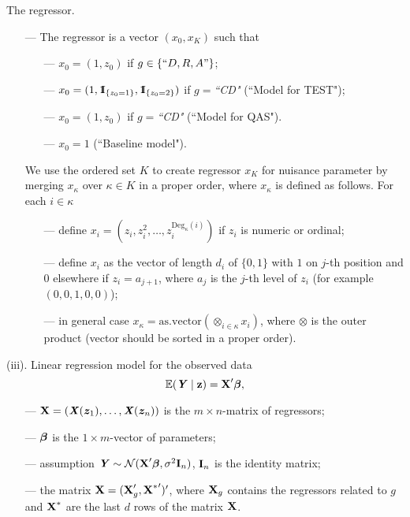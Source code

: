 \documentclass[11pt]{article}
\begin{document}
The regressor.\vspace{-2mm}
\begin{itemize}
\setlength\itemsep{-0.3em}
\item[---]
The regressor is a vector $(x_0,x_{K})$ such that \vspace{-2mm}
\begin{itemize}
\setlength\itemsep{-0.3em}
\item[---]
$x_0=(1,z_0)$ if  $g\in\{``D,R,A"\}$;
\item[---]
$x_0=(1,\indi_{\{z_0=1\}},\indi_{\{z_0=2\}})$ if  $g=${\it ``CD"} (``Model for TEST");
\item[---]
$x_0=(1,z_0)$ if  $g=${\it ``CD"}   (``Model for QAS").
\item[---]
$x_0=1$ (``Baseline model").
\end{itemize}
We use the ordered set $K$ to create regressor $x_K$ for nuisance parameter by merging $x_{\kappa}$ over $\kappa\in K$ in a proper order, where  $x_{\kappa}$ is defined as follows. For each $i\in\kappa$ \vspace{-2mm}
\begin{itemize}
\setlength\itemsep{-0.3em}
\item[---]
define $x_i=(z_i,z_i^2,\ldots,z_i^{\mathrm{Deg}_\kappa(i)})$ if $z_i$ is numeric or ordinal;
\item[---]
define $x_i$ as the vector of length $d_i$ of $\{0,1\}$ with $1$ on $j$-th position and $0$ elsewhere if $z_i=a_{j+1}$, where $a_j$ is the $j$-th level of $z_i$ (for example $(0,0,1,0,0)$);
\item[---]
in general case $ x_{\kappa}=\mathrm{as.vector}(\otimes_{i\in\kappa} x_i)$, where $\otimes$ is the outer product (vector should be sorted in a proper order).
\end{itemize}
\end{itemize}
(iii). Linear regression model for the observed data
$$
\E(\Ybi\mid\zb)=\Xb'\betab,
\vspace{-3mm}
$$
\begin{itemize}
\setlength\itemsep{-0.3em}
\item[---]
$\mbox{\bf X}=(\mbox{\textbf{\textit X}}(\mbox{\textbf{\textit z}}_1),\ldots,\mbox{\textbf{\textit X}}(\mbox{\textbf{\textit z}}_n))$ is the $m\times n$-matrix of regressors;
\item[---]
${\boldsymbol \beta}$ is the $1\times m$-vector of parameters;
\item[---]
assumption $\mbox{\textbf{\textit Y}}\sim {\cal N}(\mbox{\bf X}'{\boldsymbol \beta},\sigma^2 \mbox{\bf I}_n)$, $\mbox{\bf I}_n$ is the identity matrix;
\item[---]
the matrix $\mbox{\bf X}=(\mbox{\bf X}'_g,{\mbox{\bf X}^*}')'$, where $\mbox{\bf X}_g$ contains the regressors related to $g$ and $\mbox{\bf X}^*$ are the last $d$ rows of the matrix $\mbox{\bf X}$.
\end{itemize}
\end{document}

